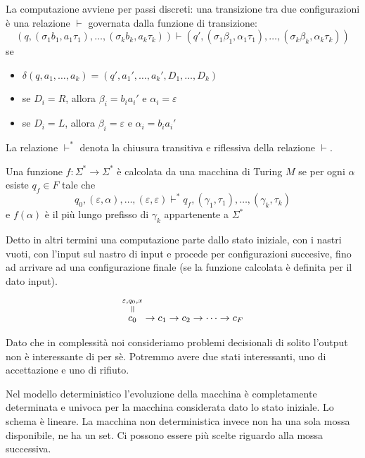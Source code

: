 La computazione avviene per passi discreti: una transizione tra due configurazioni è una relazione
$\vdash$ governata dalla funzione di transizione:
\begin{equation*}
    (q,(\sigma_{1}b_{1},a_{1}\tau_{1}),\dotsc,(\sigma_{k}b_{k},a_{k}\tau_{k})) \vdash
    (q',(\sigma_{1}\beta_{1},\alpha_{1}\tau_{1}),\dotsc,(\sigma_{k}\beta_{k},\alpha_{k}\tau_{k}))
\end{equation*}
se
\begin{itemize}
    \item $\delta(q,a_{1},\dotsc,a_{k}) = (q',a_{1}',\dotsc,a_{k}',D_{1},\dotsc,D_{k})$
    \item se $D_{i} = R$, allora $\beta_{i} = b_{i}a_{i}'$ e $\alpha_{i} = \varepsilon$
    \item se $D_{i} = L$, allora $\beta_{i} = \varepsilon$ e $\alpha_{i} = b_{i}a_{i}'$
\end{itemize}

La relazione $\vdash^{*}$ denota la chiusura transitiva e riflessiva della relazione $\vdash$.

\begin{defn}
    Una funzione $f: \Sigma^{*} \to \Sigma^{*}$ è calcolata da una macchina di Turing $M$ se per
    ogni $\alpha$ esiste $q_{f} \in F$ tale che
    \begin{equation*}
        q_{0}, (\varepsilon,\alpha),\dotsc,(\varepsilon,\varepsilon) \vdash^{*} q_{f},
        (\gamma_{1},\tau_{1}),\dotsc,(\gamma_{k},\tau_{k})
    \end{equation*}
    e $f(\alpha)$ è il più lungo prefisso di $\gamma_{k}$ appartenente a $\Sigma^{*}$
\end{defn}

Detto in altri termini una computazione parte dallo stato iniziale, con i nastri vuoti, con l'input
sul nastro di input e procede per configurazioni succesive, fino ad arrivare ad una configurazione
finale (se la funzione calcolata è definita per il dato input).

\begin{equation*}
    \overequalto{c_{0}}{\varepsilon,q_{0},x} \to c_{1} \to c_{2} \to \cdots \to c_{F}
\end{equation*}

Dato che in complessità noi consideriamo problemi decisionali di solito l'output non è
interessante di per sè. Potremmo avere due stati interessanti, uno di accettazione e uno di
rifiuto.

Nel modello deterministico l'evoluzione della macchina è completamente determinata e univoca per la
macchina considerata dato lo stato iniziale. Lo schema è lineare. La macchina non deterministica
invece non ha una sola mossa disponibile, ne ha un set. Ci possono essere più scelte riguardo alla
mossa successiva.

